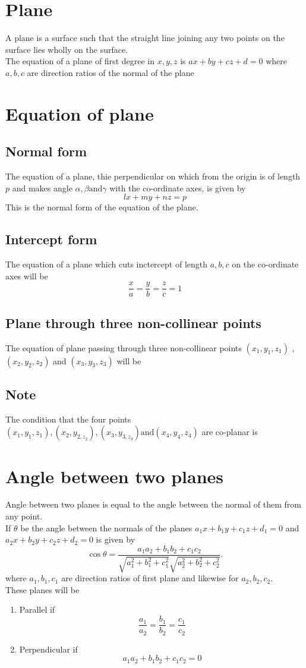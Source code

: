 \documentclass{article}
\theoremstyle{definition}
\begin{document}
\section*{Plane}
A plane is a surface such that the straight line joining any two points on the surface lies wholly on the surface. \\
The equation of a plane of first degree in $x, y, z$ is  $\boxed{ax+by+cz+d = 0}$ where  $a, b, c $ are direction ratios of the normal of the plane

\section*{Equation of plane}
\subsection{Normal form} 
The equation of a plane, thie perpendicular on which from the origin is of length $p$ and makes angle  $\alpha, \beta \text{and} \gamma$ with the co-ordinate axes, is given by \[\boxed{lx+my+nz=p}\]
This is the normal form of the equation of the plane.
\subsection{Intercept form}
The equation of a plane which cuts inctercept of length $a, b, c$ on the co-ordinate axes will be \[
	\frac{x}{a} = \frac{y}{b} = \frac{z}{c} = 1
\]
\subsection{Plane through three non-collinear points}
The equation of plane passing through three non-collinear points $(x_{1},y_{1},z_{1})$ , $(x_{2},y_{2},z_{2})$ and $(x_{3},y_{3},z_{3})$ will be \[
	\boxed{}
\]
\subsection*{Note}
The condition that the four points $(x_{1},y_{1},z_{1}),(x_{2},y_{2,z_{2}}),(x_{3},y_{3,z_{3}}) \text{and} (x_{4},y_{4},z_{4})$ are co-planar is

\section*{Angle between two planes}
Angle between two planes is equal to the angle between the normal of them from any point. \\
If $\theta$ be the angle between the normals of the planes $a_{1}x+b_{1}y+c_{1}z+d_{1} = 0$ and
$a_{2}x+b_{2}y+c_{2}z + d_{2} = 0$ 
is given by \[
	\cos\theta = \dfrac{a_{1}a_{2} + b_{1}b_{2} + c_{1}c_{2}}{\sqrt{a_{1} ^{2}+b_{1} ^{2}+c_{1} ^{2}}\sqrt{a_{2} ^{2} + b_{2} ^{2} + c_{2} ^{2} }}
.\]
where $a_{1},b_{1},c_{1}$ are direction ratios of first plane and likewise for $a_{2},b_{2},c_{2}$.\\
These planes will be
\begin{enumerate}
	\item Parallel if
		\[
			\frac{a_{1}}{a_{2}}=\frac{b_{1}}{b_{2}}=\frac{c_{1}}{c_{2}}
		\]
	\item Perpendicular if \[
	a_{1}a_{2}+b_{1}b_{2}+c_{1}c_{2} = 0
	\]
\end{enumerate}
\end{document}
